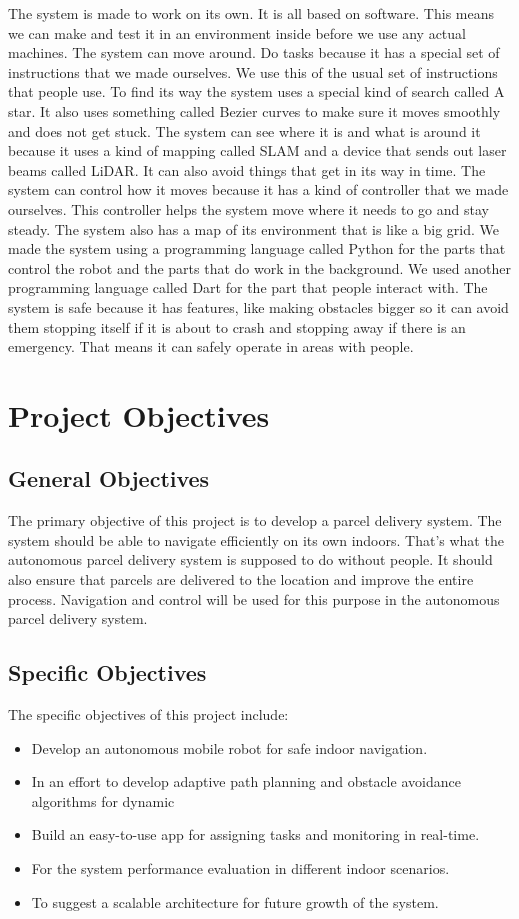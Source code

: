 The system is made to work on its own. It is all based on software. This means we can make and test it in an environment inside before we use any actual machines. The system can move around. Do tasks because it has a special set of instructions that we made ourselves. We use this of the usual set of instructions that people use.
To find its way the system uses a special kind of search called A star. It also uses something called Bezier curves to make sure it moves smoothly and does not get stuck. The system can see where it is and what is around it because it uses a kind of mapping called SLAM and a device that sends out laser beams called LiDAR. It can also avoid things that get in its way in time.
The system can control how it moves because it has a kind of controller that we made ourselves. This controller helps the system move where it needs to go and stay steady. The system also has a map of its environment that is like a big grid.
We made the system using a programming language called Python for the parts that control the robot and the parts that do work in the background. We used another programming language called Dart for the part that people interact with. The system is safe because it has features, like making obstacles bigger so it can avoid them stopping itself if it is about to crash and stopping away if there is an emergency. That means it can safely operate in areas with people.
\section{Project Objectives}

\subsection{General Objectives}
The primary objective of this project is to develop a parcel delivery system. The system should be able to navigate efficiently on its own indoors. That's what the autonomous parcel delivery system is supposed to do without people. It should also ensure that parcels are delivered to the location and improve the entire process. Navigation and control will be used for this purpose in the autonomous parcel delivery system.
\subsection{Specific Objectives}

The specific objectives of this project include:
\begin{itemize}
    \item Develop an autonomous mobile robot for safe indoor navigation.
    \item In an effort to develop adaptive path planning and obstacle avoidance algorithms for dynamic
    \item Build an easy-to-use app for assigning tasks and monitoring in real-time.
    \item For the system performance evaluation in different indoor scenarios.
    \item To suggest a scalable architecture for future growth of the system.
\end{itemize}


